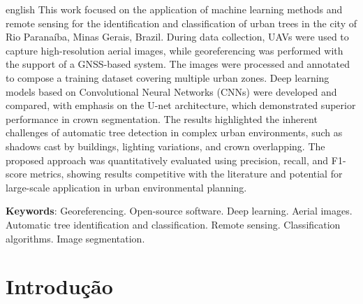 \documentclass[
    12pt,
    openright,
    oneside,
    a4paper,
    sumario=tradicional,
    english,
    brazil,
    ]{abntex2}
\begin{document}
\begin{resumo}[Abstract]
\begin{otherlanguage*}{english}
   \noindent
This work focused on the application of machine learning methods and remote sensing for the identification and classification of urban trees in the city of Rio Paranaíba, Minas Gerais, Brazil. During data collection, UAVs were used to capture high-resolution aerial images, while georeferencing was performed with the support of a GNSS-based system. The images were processed and annotated to compose a training dataset covering multiple urban zones. Deep learning models based on Convolutional Neural Networks (CNNs) were developed and compared, with emphasis on the U-net architecture, which demonstrated superior performance in crown segmentation. The results highlighted the inherent challenges of automatic tree detection in complex urban environments, such as shadows cast by buildings, lighting variations, and crown overlapping. The proposed approach was quantitatively evaluated using precision, recall, and F1-score metrics, showing results competitive with the literature and potential for large-scale application in urban environmental planning.
   \vspace{\onelineskip}

   \noindent
   \textbf{Keywords}: Georeferencing.
        Open-source software.
        Deep learning.
        Aerial images.
        Automatic tree identification and classification.
        Remote sensing.
        Classification algorithms.
        Image segmentation.
 \end{otherlanguage*}
\end{resumo}

\listoffigures*
\cleardoublepage

\listoftables*
\cleardoublepage


\newpage

\tableofcontents*
\cleardoublepage

\textual

\chapter{Introdução}\label{sec:introducao}
\end{document}
